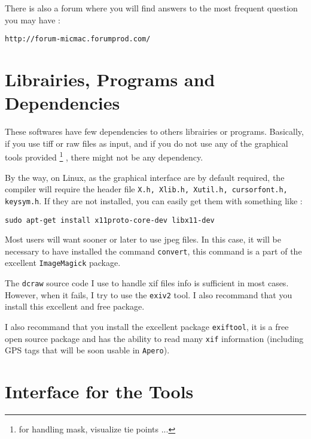 There is also a forum where you will find answers to the most frequent question 
you may have :


\begin{verbatim}
http://forum-micmac.forumprod.com/
\end{verbatim}



\section{Librairies, Programs and Dependencies}

These softwares have few dependencies to others librairies or programs. Basically,
if you use tiff or raw files as input, and if you do not use any of the graphical
tools provided \footnote{for handling mask, visualize tie points ...} ,
there might not be any dependency. 

By the way, on Linux, as the graphical interface are by default required, the compiler
will require the header file {\tt X.h, Xlib.h, Xutil.h, cursorfont.h, keysym.h}.
If they are not installed, you can easily get them  with something like :


\begin{verbatim}
sudo apt-get install x11proto-core-dev libx11-dev
\end{verbatim}

Most users will want sooner or later to use jpeg files. In this case, it will be necessary
to have installed the command {\tt convert}, this command is a part of the excellent
{\tt ImageMagick} package.


The {\tt dcraw} source code I use to handle xif files info is sufficient in most cases.
However, when it fails, I try to use the {\tt exiv2} tool. I also recommand that 
you install this excellent and free package.

I also recommand that you install the excellent package {\tt exiftool}, it is a free
open source package and has the ability to read many {\tt xif} information (including
GPS tags that will be soon usable in {\tt Apero}).




\section{Interface for the Tools}

